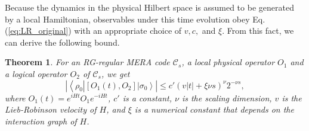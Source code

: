 \documentclass[a4paper,11pt]{article}
\newcommand{\bra}[1]{\left\langle #1 \right|}
\newcommand{\ket}[1]{\left|#1\right\rangle}
\newcommand{\1}{\mathbbm{1}}
\newcommand{\cC}{\mathcal{C}}
\newtheorem{thm}{Theorem}
\begin{document}
Because the dynamics in the physical Hilbert space is assumed to be generated by a local Hamiltonian, observables under this time evolution obey Eq. (\ref{eq:LR_original}) with an appropriate choice of $v,c,$ and $\xi$. From this fact, we can derive the following bound.
\begin{thm}
For an RG-regular MERA code $\cC_s$, a local physical operator $O_1$ and a logical operator $O_2$ of $\cC_s$, we get
\begin{equation}
|\bra{\rho_0} [O_1(t),O_2] \ket{\sigma_0} |\leq c' (v|t| + \xi \nu s)^{\nu} 2^{-\nu s},\label{eqn:LRB}
\end{equation}
where $O_1(t)=e^{iHt} O_1 e^{-iHt}$, $c'$ is a constant, $\nu$ is the scaling dimension, $v$ is the Lieb-Robinson velocity of $H$, and $\xi$ is a numerical constant that depends on the interaction graph
of $H$.%
\end{thm}
\end{document}

